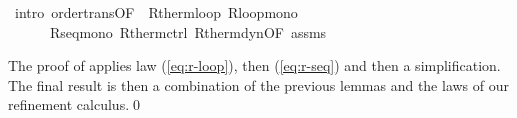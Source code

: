 \documentclass[envcountsame,envcountsect]{llncs}
\begin{document}
\begin{example}
\begin{isabellebody}
\isamarkupfalse%
\ {\isacharparenleft}intro\ order{\isacharunderscore}trans{\isacharbrackleft}OF\ {\isacharunderscore}\ R{\isacharunderscore}therm{\isacharunderscore}loop{\isacharbrackright}\ R{\isacharunderscore}loop{\isacharunderscore}mono\ \isanewline
\ \ \ \ \ \ R{\isacharunderscore}seq{\isacharunderscore}mono\ R{\isacharunderscore}therm{\isacharunderscore}ctrl\ R{\isacharunderscore}therm{\isacharunderscore}dyn{\isacharbrackleft}OF\ assms{\isacharbrackright}{\isacharparenright}\isanewline
\end{isabellebody}

The proof of  applies law (\ref{eq:r-loop}), then (\ref{eq:r-seq}) and then a simplification. The final result  is then a combination of the previous lemmas and the laws of our refinement calculus.\qed
\end{example}
\end{document}
